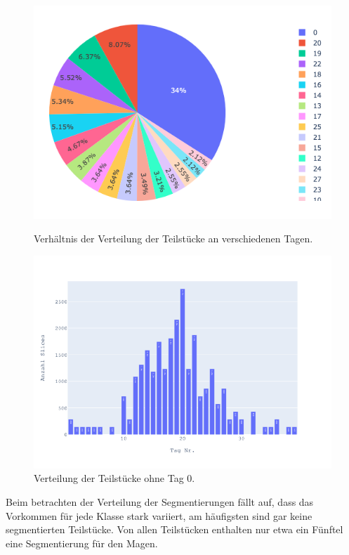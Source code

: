 \begin{figure}[H]
   \begin{minipage}{0.48\textwidth}
     \centering
		\includegraphics[width=1\linewidth]{LaTex/bilder/day_slice_pie.png}
		\caption{Verhältnis der Verteilung der Teilstücke an verschiedenen Tagen.}\label{Fig:pie-chart}
   \end{minipage}\hfill
   \begin{minipage}{0.48\textwidth}
     \centering
     \includegraphics[width=1.2\linewidth]{LaTex/bilder/day_slice.png}
     \caption{Verteilung der Teilstücke ohne Tag 0.}\label{Fig:slice_per_day}
   \end{minipage}
\end{figure}

Beim betrachten der Verteilung der Segmentierungen fällt auf, dass das Vorkommen für jede Klasse stark variiert, am häufigsten sind gar keine segmentierten Teilstücke. Von allen Teilstücken enthalten nur etwa ein Fünftel eine Segmentierung für den Magen. 


